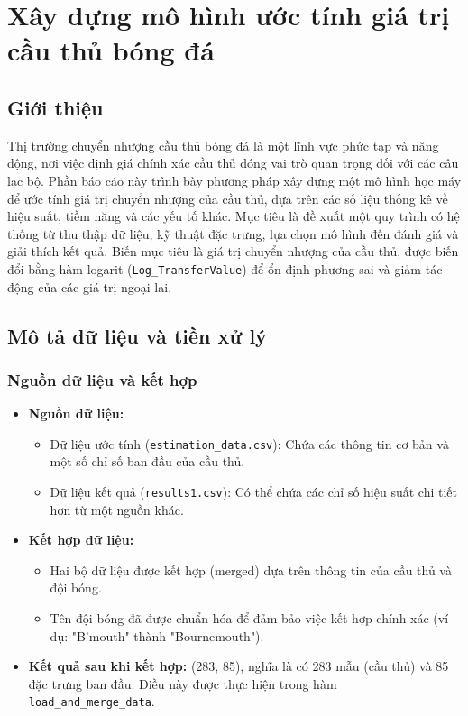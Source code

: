 \documentclass[12pt, a4paper]{report}
\begin{document}
\section{Xây dựng mô hình ước tính giá trị cầu thủ bóng đá}

\subsection{Giới thiệu}
Thị trường chuyển nhượng cầu thủ bóng đá là một lĩnh vực phức tạp và năng động, nơi việc định giá chính xác cầu thủ đóng vai trò quan trọng đối với các câu lạc bộ.
Phần báo cáo này trình bày phương pháp xây dựng một mô hình học máy để ước tính giá trị chuyển nhượng của cầu thủ, dựa trên các số liệu thống kê về hiệu suất, tiềm năng và các yếu tố khác.
Mục tiêu là đề xuất một quy trình có hệ thống từ thu thập dữ liệu, kỹ thuật đặc trưng, lựa chọn mô hình đến đánh giá và giải thích kết quả.
Biến mục tiêu là giá trị chuyển nhượng của cầu thủ, được biến đổi bằng hàm logarit (\texttt{Log\_TransferValue}) để ổn định phương sai và giảm tác động của các giá trị ngoại lai.

\subsection{Mô tả dữ liệu và tiền xử lý}
\subsubsection*{Nguồn dữ liệu và kết hợp}
\begin{itemize}
    \item \textbf{Nguồn dữ liệu:}
    \begin{itemize}
        \item Dữ liệu ước tính (\texttt{estimation\_data.csv}): Chứa các thông tin cơ bản và một số chỉ số ban đầu của cầu thủ.
        \item Dữ liệu kết quả (\texttt{results1.csv}): Có thể chứa các chỉ số hiệu suất chi tiết hơn từ một nguồn khác.
    \end{itemize}
    \item \textbf{Kết hợp dữ liệu:}
    \begin{itemize}
        \item Hai bộ dữ liệu được kết hợp (merged) dựa trên thông tin của cầu thủ và đội bóng.
        \item Tên đội bóng đã được chuẩn hóa để đảm bảo việc kết hợp chính xác (ví dụ: "B'mouth" thành "Bournemouth").
    \end{itemize}
    \item \textbf{Kết quả sau khi kết hợp:} (283, 85), nghĩa là có 283 mẫu (cầu thủ) và 85 đặc trưng ban đầu. Điều này được thực hiện trong hàm \texttt{load\_and\_merge\_data}.
\end{itemize}
\end{document}
